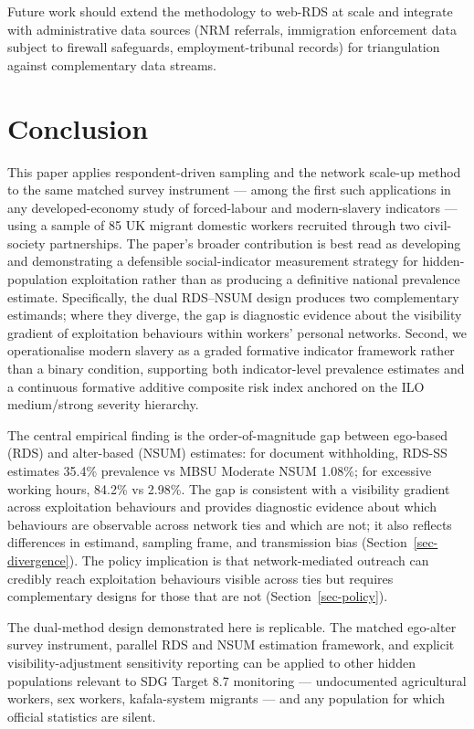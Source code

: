 \documentclass[
  12pt,
  letterpaper,
  DIV=11,
  numbers=noendperiod]{scrartcl}
\begin{document}
Future work should extend the methodology to web-RDS at scale and
integrate with administrative data sources (NRM referrals, immigration
enforcement data subject to firewall safeguards, employment-tribunal
records) for triangulation against complementary data streams.

\section{Conclusion}\label{sec-conclusion}

This paper applies respondent-driven sampling and the network scale-up
method to the same matched survey instrument --- among the first such
applications in any developed-economy study of forced-labour and
modern-slavery indicators --- using a sample of 85 UK migrant domestic
workers recruited through two civil-society partnerships. The paper's
broader contribution is best read as developing and demonstrating a
defensible social-indicator measurement strategy for hidden-population
exploitation rather than as producing a definitive national prevalence
estimate. Specifically, the dual RDS--NSUM design produces two
complementary estimands; where they diverge, the gap is diagnostic
evidence about the visibility gradient of exploitation behaviours within
workers' personal networks. Second, we operationalise modern slavery as
a graded formative indicator framework rather than a binary condition,
supporting both indicator-level prevalence estimates and a continuous
formative additive composite risk index anchored on the ILO
medium/strong severity hierarchy.

The central empirical finding is the order-of-magnitude gap between
ego-based (RDS) and alter-based (NSUM) estimates: for document
withholding, RDS-SS estimates 35.4\% prevalence vs MBSU Moderate NSUM
1.08\%; for excessive working hours, 84.2\% vs 2.98\%. The gap is
consistent with a visibility gradient across exploitation behaviours and
provides diagnostic evidence about which behaviours are observable
across network ties and which are not; it also reflects differences in
estimand, sampling frame, and transmission bias
(Section~\ref{sec-divergence}). The policy implication is that
network-mediated outreach can credibly reach exploitation behaviours
visible across ties but requires complementary designs for those that
are not (Section~\ref{sec-policy}).

The dual-method design demonstrated here is replicable. The matched
ego-alter survey instrument, parallel RDS and NSUM estimation framework,
and explicit visibility-adjustment sensitivity reporting can be applied
to other hidden populations relevant to SDG Target 8.7 monitoring ---
undocumented agricultural workers, sex workers, kafala-system migrants
--- and any population for which official statistics are silent.
\end{document}
